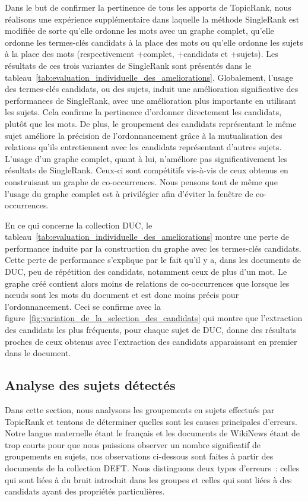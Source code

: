     Dans le but de confirmer la pertinence de tous les apports de TopicRank,
    nous réalisons une expérience supplémentaire dans laquelle la méthode
    SingleRank est modifiée de sorte qu'elle ordonne les mots avec un graphe
    complet, qu'elle ordonne les termes-clés candidats à la place des mots ou
    qu'elle ordonne les sujets à la place des mots (respectivement +complet,
    +candidats et +sujets). Les résultats de ces trois variantes de SingleRank
    sont présentés dans le
    tableau~\ref{tab:evaluation_individuelle_des_ameliorations}. Globalement,
    l'usage des termes-clés candidats, ou des sujets, induit une amélioration
    significative des performances de SingleRank, avec une amélioration plus
    importante en utilisant les sujets. Cela confirme la pertinence d'ordonner
    directement les candidats, plutôt que les mots. De plus, le groupement des
    candidats représentant le même sujet améliore la précision de
    l'ordonnancement grâce à la mutualisation des relations qu'ils entretiennent
    avec les candidats représentant d'autres sujets. L'usage d'un graphe
    complet, quant à lui, n'améliore pas significativement les résultats de
    SingleRank. Ceux-ci sont compétitifs vis-à-vis de ceux obtenus en
    construisant un graphe de co-occurrences. Nous pensons tout de même que
    l'usage du graphe complet est à privilégier afin d'éviter la fenêtre de
    co-occurrences.
    
    En ce qui concerne la collection DUC, le
    tableau~\ref{tab:evaluation_individuelle_des_ameliorations} montre une perte
    de performance induite par la construction du graphe avec les termes-clés
    candidats. Cette perte de performance s'explique par le fait qu'il y a, dans
    les documents de DUC, peu de répétition des candidats, notamment ceux de
    plus d'un mot. Le graphe créé contient alors moins de relations de
    co-occurrences que lorsque les n\oe{}uds sont les mots du document et est
    donc moins précis pour l'ordonnancement. Ceci se confirme avec la
    figure~\ref{fig:variation_de_la_selection_des_candidats} qui montre que
    l'extraction des candidats les plus fréquents, pour chaque sujet de DUC,
    donne des résultats proches de ceux obtenus avec l'extraction des candidats
    apparaissant en premier dans le document.

  \subsection{Analyse des sujets détectés}
  \label{subsec:analyse_des_sujets_générés}
    Dans cette section, nous analysons les groupements en sujets effectués par
    TopicRank et tentons de déterminer quelles sont les causes principales
    d'erreurs. Notre langue maternelle étant le français et les documents de
    WikiNews étant de trop courts pour que nous puissions observer un nombre
    significatif de groupements en sujets, nos observations ci-dessous sont
    faites à partir des documents de la collection DEFT. Nous distinguons deux
    types d'erreurs~: celles qui sont liées à du bruit introduit dans les
    groupes et celles qui sont liées à des candidats ayant des propriétés
    particulières.

